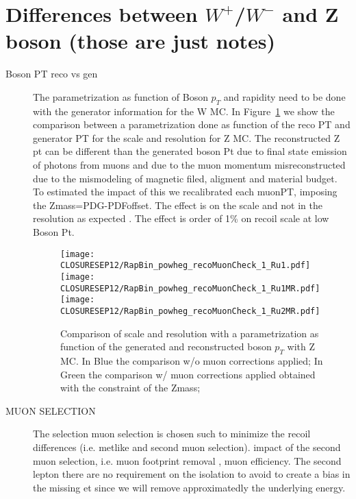 \documentclass[41pt,a4paper,oneside]{report}
\begin{document}
\section{Differences between $W^{+}$/$W^{-}$ and Z boson (those are just notes)}
\label{sec:WvsZ}

\begin{description}

\item[Boson PT reco vs gen] The parametrization as function of Boson $p_{T}$ and rapidity need to be done with the generator information for the W MC.
In Figure~\ref{fig:RecoGenPtBinning} we show the comparison between a parametrization done as function of the reco PT and generator PT for the scale and resolution for Z MC. 
The reconstructed Z pt can be different than the generated boson Pt due to final state emission of photons from muons and due to the muon momentum misreconstructed due to the mismodeling of magnetic filed, aligment and material budget. 
To estimated the impact of this we recalibrated each muonPT, imposing the Zmass=PDG-PDFoffset.
The effect is on the scale and not in the resolution as expected . The effect is order of 1\% on recoil scale at low Boson Pt.

\begin{figure}[h!]
  \begin{center}
    \texttt{[image: CLOSURESEP12/RapBin\_powheg\_recoMuonCheck\_1\_Ru1.pdf]}
    \texttt{[image: CLOSURESEP12/RapBin\_powheg\_recoMuonCheck\_1\_Ru1MR.pdf]}
    \texttt{[image: CLOSURESEP12/RapBin\_powheg\_recoMuonCheck\_1\_Ru2MR.pdf]}
    \caption{Comparison of scale and resolution with a parametrization as function of the generated and reconstructed boson $p_{T}$ with Z MC.
      In Blue the comparison w/o muon corrections applied; In Green the comparison w/ muon corrections applied obtained with the constraint of the Zmass;  {\color{blue}{plot oder than OCT6}}
    }
    \label{fig:RecoGenPtBinning}
  \end{center}
\end{figure}

\item[MUON SELECTION] The selection muon selection is chosen such to minimize the recoil differences (i.e. metlike and second muon selection).
impact of the second muon selection, i.e. muon footprint removal , muon efficiency.
The second lepton there are no requirement on the isolation to avoid to create a bias in the missing et since we will remove approximatedly the underlying energy.



\end{description}
\end{document}
